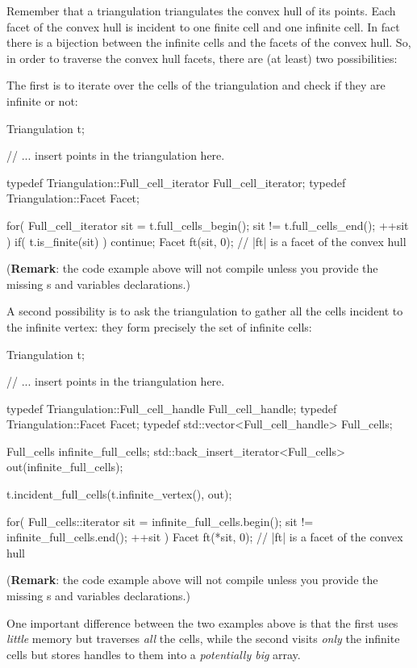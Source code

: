 Remember that a triangulation triangulates the convex hull of its points. Each
facet of the convex hull is incident to one finite cell and one infinite
cell. In fact there is a bijection between the infinite cells and the
facets of the convex hull. So, in order to traverse the convex hull facets,
there are (at least) two possibilities:

The first is to iterate over the cells of the triangulation and check if they
are infinite or not:

\begin{ccExampleCode}
Triangulation t;

// ... insert points in the triangulation here.

typedef Triangulation::Full_cell_iterator Full_cell_iterator;
typedef Triangulation::Facet Facet;

for( Full_cell_iterator sit = t.full_cells_begin(); sit != t.full_cells_end(); ++sit )
{
    if( t.is_finite(sit) )
        continue;
    Facet ft(sit, 0); // |ft| is a facet of the convex hull
}
\end{ccExampleCode}
(\textbf{Remark}: the code example above will not compile unless you provide
the missing s and variables declarations.)

A second possibility is to ask the triangulation to gather all the cells
incident to the infinite vertex: they form precisely the set of infinite
cells:

\begin{ccExampleCode}
Triangulation t;

// ... insert points in the triangulation here.

typedef Triangulation::Full_cell_handle Full_cell_handle;
typedef Triangulation::Facet Facet;
typedef std::vector<Full_cell_handle> Full_cells;

Full_cells infinite_full_cells;
std::back_insert_iterator<Full_cells> out(infinite_full_cells);

t.incident_full_cells(t.infinite_vertex(), out);

for( Full_cells::iterator sit = infinite_full_cells.begin(); sit != infinite_full_cells.end(); ++sit )
{
    Facet ft(*sit, 0); // |ft| is a facet of the convex hull
}
\end{ccExampleCode}
(\textbf{Remark}: the code example above will not compile unless you provide
the missing s and variables declarations.)

One important difference between the two examples above is that the first uses
\emph{little} memory but traverses \emph{all} the cells, while the second
visits \emph{only} the infinite cells but stores handles to them into a
\emph{potentially big} array.

